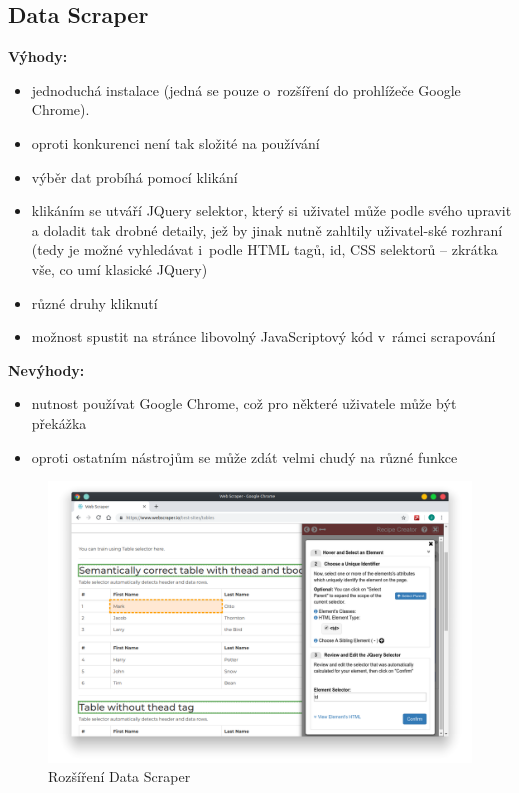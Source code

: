 \documentclass[thesis=B,czech]{FITthesis}[2012/06/26]
\begin{document}
\subsection{Data Scraper}
\textbf{Výhody:}
\begin{itemize}
	\item jednoduchá instalace (jedná se pouze o~rozšíření do prohlížeče Google Chrome).
	\item oproti konkurenci není tak složité na používání
	\item výběr dat probíhá pomocí klikání
	\item klikáním se utváří JQuery selektor, který si uživatel může podle svého upravit a doladit tak drobné detaily, jež by jinak nutně zahltily uživatel-ské rozhraní (tedy je možné vyhledávat i~podle HTML tagů, id, CSS selektorů -- zkrátka vše, co umí klasické JQuery)
	\item různé druhy kliknutí
	\item možnost spustit na stránce libovolný JavaScriptový kód v~rámci scrapování
\end{itemize}
\textbf{Nevýhody:}
\begin{itemize}
	\item nutnost používat Google Chrome, což pro některé uživatele může být překážka
	\item oproti ostatním nástrojům se může zdát velmi chudý na různé funkce
\end{itemize}
\begin{figure}
	\includegraphics[width=\linewidth]{images/DataScraper.png}
	\caption[Rozšíření Data Scraper]{Rozšíření Data Scraper~\cite[snímek pořídil autor]{data_scraper}}
	\label{fig:dataScraper}
\end{figure}
\end{document}
